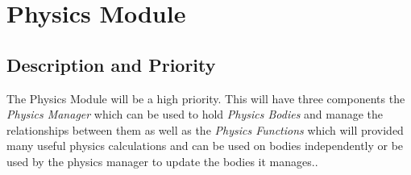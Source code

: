 \documentclass{scrreprt}
\begin{document}
\section{Physics Module}

\subsection{Description and Priority}
The Physics Module will be a high priority. This will have three components the \textit{Physics Manager} which can be used to hold \textit{Physics Bodies} and manage the relationships between them as well as the \textit{Physics Functions} which will provided many useful physics calculations and can be used on bodies independently or be used by the physics manager to update the bodies it manages..
\end{document}
